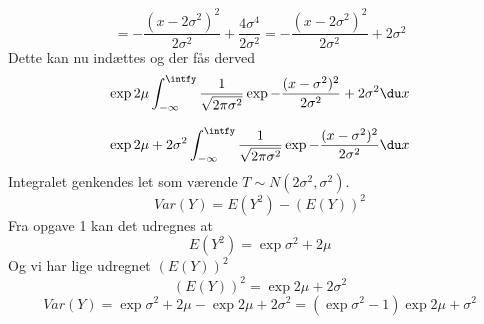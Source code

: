 \[
= -\frac{(x - 2\sigma^2)^2}{2\sigma^2} + \frac{4\sigma^4}{2\sigma^2} = -\frac{(x-2\sigma^2)^2}{2\sigma^2} + 2\sigma^2
\]
Dette kan nu ind\ae ttes og der f\aa s derved
\[
\exp{2\mu} \int_{-\infty}^{\intfy} \frac{1}{\sqrt{2\pi\sigma^{2}}} \exp{-\frac{(x-\sigma^2)^2}{2\sigma^2} + 2\sigma^2} \du x
\]

\[
\exp{2\mu+2\sigma^2} \int_{-\infty}^{\intfy} \frac{1}{\sqrt{2\pi\sigma^{2}}} \exp{-\frac{(x-\sigma^2)^2}{2\sigma^2}} \du x
\]
Integralet genkendes let som v\ae rende $T \sim N(2\sigma^2, \sigma^2)$.
\[
Var(Y) = E(Y^2) - (E(Y))^2
\]
Fra opgave 1 kan det udregnes at 
\[
E(Y^2) = \exp{\sigma^2 + 2\mu}
\]
Og vi har lige udregnet $(E(Y))^2$
\[
(E(Y))^2 = \exp{2\mu+2\sigma^2}
\]
\[
Var(Y) = \exp{\sigma^2 + 2\mu} - \exp{2\mu+2\sigma^2} = (\exp{\sigma^2} - 1)\exp{2\mu + \sigma^2}
\]

